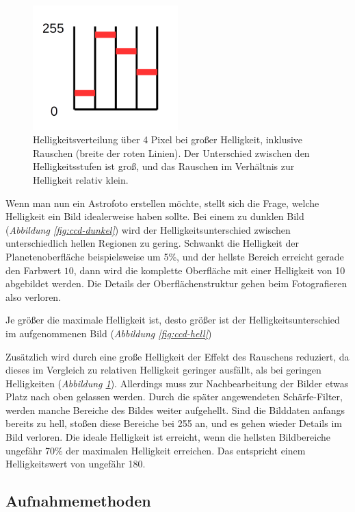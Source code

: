 \documentclass[10pt,a4paper,titlepage]{article}
\begin{document}
\begin{figure}[h!]
  \centering
    \includegraphics[width=0.5\textwidth]{CCD_Rauschen}
  \caption{Helligkeitsverteilung über 4 Pixel bei großer Helligkeit, inklusive Rauschen (breite der roten Linien). Der Unterschied zwischen den Helligkeitsstufen ist groß, und das Rauschen im Verhältnis zur Helligkeit relativ klein.}
  \label{fig:ccd-rauschen}
\end{figure}

Wenn man nun ein Astrofoto erstellen möchte, stellt sich die Frage, welche Helligkeit ein Bild idealerweise haben sollte. Bei einem zu dunklen Bild (\textit{Abbildung \ref{fig:ccd-dunkel}}) wird der Helligkeitsunterschied zwischen unterschiedlich hellen Regionen zu gering. Schwankt die Helligkeit der Planetenoberfläche beispielsweise um 5\%, und der hellste Bereich erreicht gerade den Farbwert $10$, dann wird die komplette Oberfläche mit einer Helligkeit von 10 abgebildet werden. Die Details der Oberflächenstruktur gehen beim Fotografieren also verloren.

Je größer die maximale Helligkeit ist, desto größer ist der Helligkeitsunterschied im aufgenommenen Bild (\textit{Abbildung \ref{fig:ccd-hell}})

Zusätzlich wird durch eine große Helligkeit der Effekt des Rauschens reduziert, da dieses im Vergleich zu relativen Helligkeit geringer ausfällt, als bei geringen Helligkeiten (\textit{Abbildung \ref{fig:ccd-rauschen}}). Allerdings muss zur Nachbearbeitung der Bilder etwas Platz nach oben gelassen werden. Durch die später angewendeten Schärfe-Filter, werden manche Bereiche des Bildes weiter aufgehellt. Sind die Bilddaten anfangs bereits zu hell, stoßen diese Bereiche bei 255 an, und es gehen wieder Details im Bild verloren. Die ideale Helligkeit ist erreicht, wenn die hellsten Bildbereiche ungefähr 70\% der maximalen Helligkeit erreichen. Das entspricht einem Helligkeitswert von ungefähr 180.

\subsection{Aufnahmemethoden}
\end{document}
